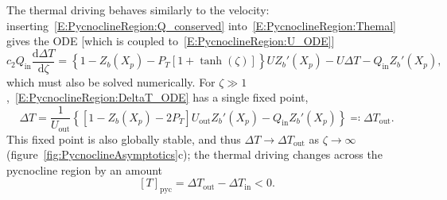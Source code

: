 \documentclass[openacc]{rsproca_new}%
\newcommand{\dd}[2]{\frac{\mathrm{d} #1}{\mathrm{d} #2}}
\newcommand{\Pt}{\textit{P}_T}
\newcommand{\ctwo}{c_2}  %
\renewcommand{\in}{\text{in}} %
\newcommand{\out}{\text{out}}
\begin{document}
The thermal driving behaves similarly to the velocity: inserting~\eqref{E:PycnoclineRegion:Q_conserved} into~\eqref{E:PycnoclineRegion:Themal} gives the ODE [which is coupled to~\eqref{E:PycnoclineRegion:U_ODE}]
\begin{equation}\label{E:PycnoclineRegion:DeltaT_ODE}
\ctwo Q_\in \dd{\Delta T}{\zeta} = \left\{1 - Z_b(X_p) - \Pt\left[1 + \tanh(\zeta)\right]\right\}UZ_b'(X_p) - U\Delta T - Q_\in Z_b'(X_p), 
\end{equation}
which must also be solved numerically. For $\zeta \gg 1$,~\eqref{E:PycnoclineRegion:DeltaT_ODE} has a single fixed point,
\begin{equation}\label{E:PycnoclineRegion:DeltaT_Limit}
\Delta T = \frac{1}{U_\out}\left\{\left[1 - Z_b(X_p) - 2\Pt\right]U_\out Z_b'(X_p) - Q_\in Z_b'(X_p)\right\} \eqcolon \Delta T_\out.
\end{equation}
This fixed point is also globally stable, and thus $\Delta T \to \Delta T_\out$ as $\zeta \to \infty$ (figure~\ref{fig:PycnoclineAsymptotics}c); the thermal driving changes across the pycnocline region by an amount 
\begin{equation}\label{E:PycnoclineRegion:DeltaT_change}
\left[T\right]_{\text{pyc}} = \Delta T_\out - \Delta T_\in < 0.
\end{equation} 
\end{document}
